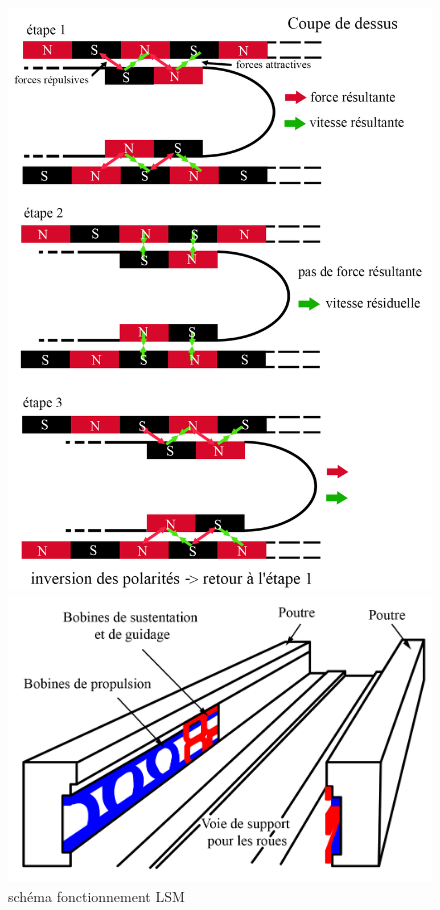 \documentclass[12pt, a4paper, onecolumn]{article}
\begin{document}
\begin{figure}[H]
  \centering
  \begin{minipage}{.51\linewidth}
    \includegraphics[width=\textwidth]{img/schemaLSM.png}
    \caption{schéma fonctionnement LSM}
    \label{schemaLSM}
  \end{minipage}
  \begin{minipage}{.48\linewidth}
    \includegraphics[width=\textwidth]{img/voirie.png}

\end{minipage}
\end{figure}
\end{document}
